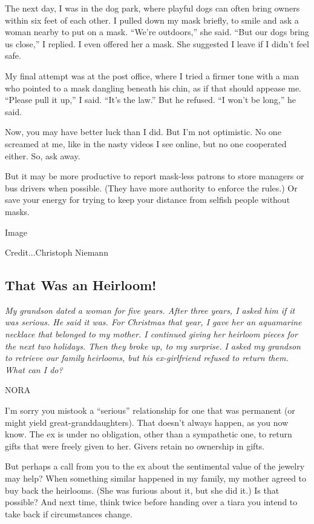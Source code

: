 The next day, I was in the dog park, where playful dogs can often bring
owners within six feet of each other. I pulled down my mask briefly, to
smile and ask a woman nearby to put on a mask. ``We're outdoors,'' she
said. ``But our dogs bring us close,'' I replied. I even offered her a
mask. She suggested I leave if I didn't feel safe.

My final attempt was at the post office, where I tried a firmer tone
with a man who pointed to a mask dangling beneath his chin, as if that
should appease me. ``Please pull it up,'' I said. ``It's the law.'' But
he refused. ``I won't be long,'' he said.

Now, you may have better luck than I did. But I'm not optimistic. No one
screamed at me, like in the nasty videos I see online, but no one
cooperated either. So, ask away.

But it may be more productive to report mask-less patrons to store
managers or bus drivers when possible. (They have more authority to
enforce the rules.) Or save your energy for trying to keep your distance
from selfish people without masks.

Image

Credit...Christoph Niemann

\hypertarget{that-was-an-heirloom}{%
\subsection{That Was an Heirloom!}\label{that-was-an-heirloom}}

\emph{My grandson dated a woman for five years. After three years, I
asked him if it was serious. He said it was. For Christmas that year, I
gave her an aquamarine necklace that belonged to my mother. I continued
giving her heirloom pieces for the next two holidays. Then they broke
up, to my surprise. I asked my grandson to retrieve our family
heirlooms, but his ex-girlfriend refused to return them. What can I do?}

NORA

I'm sorry you mistook a ``serious'' relationship for one that was
permanent (or might yield great-granddaughters). That doesn't always
happen, as you now know. The ex is under no obligation, other than a
sympathetic one, to return gifts that were freely given to her. Givers
retain no ownership in gifts.

But perhaps a call from you to the ex about the sentimental value of the
jewelry may help? When something similar happened in my family, my
mother agreed to buy back the heirlooms. (She was furious about it, but
she did it.) Is that possible? And next time, think twice before handing
over a tiara you intend to take back if circumstances change.


